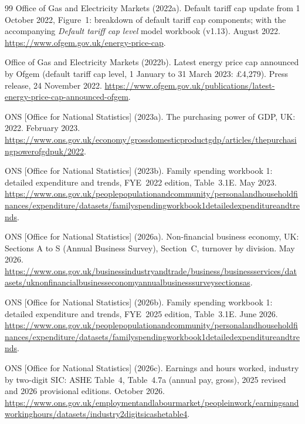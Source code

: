 \begin{thebibliography}{99}
Office of Gas and Electricity Markets (2022a).
\newblock Default tariff cap update from 1 October 2022, Figure~1: breakdown of default tariff cap components; with the accompanying \emph{Default tariff cap level} model workbook (v1.13).
 August 2022. \url{https://www.ofgem.gov.uk/energy-price-cap}.

Office of Gas and Electricity Markets (2022b).
\newblock Latest energy price cap announced by Ofgem (default tariff cap level, 1 January to 31 March 2023: \pounds 4{,}279).
\newblock Press release, 24 November 2022. \url{https://www.ofgem.gov.uk/publications/latest-energy-price-cap-announced-ofgem}.

ONS [Office for National Statistics] (2023a).
\newblock The purchasing power of GDP, UK: 2022.
 February 2023. \url{https://www.ons.gov.uk/economy/grossdomesticproductgdp/articles/thepurchasingpowerofgdpuk/2022}.

ONS [Office for National Statistics] (2023b).
\newblock Family spending workbook 1: detailed expenditure and trends, FYE~2022 edition, Table~3.1E.
 May 2023. \url{https://www.ons.gov.uk/peoplepopulationandcommunity/personalandhouseholdfinances/expenditure/datasets/familyspendingworkbook1detailedexpenditureandtrends}.

ONS [Office for National Statistics] (2026a).
\newblock Non-financial business economy, UK: Sections A to S (Annual Business Survey), Section~C, turnover by division.
 May 2026. \url{https://www.ons.gov.uk/businessindustryandtrade/business/businessservices/datasets/uknonfinancialbusinesseconomyannualbusinesssurveysectionsas}.

ONS [Office for National Statistics] (2026b).
\newblock Family spending workbook 1: detailed expenditure and trends, FYE~2025 edition, Table~3.1E.
 June 2026. \url{https://www.ons.gov.uk/peoplepopulationandcommunity/personalandhouseholdfinances/expenditure/datasets/familyspendingworkbook1detailedexpenditureandtrends}.

ONS [Office for National Statistics] (2026c).
\newblock Earnings and hours worked, industry by two-digit SIC: ASHE Table~4, Table~4.7a (annual pay, gross), 2025 revised and 2026 provisional editions.
 October 2026. \url{https://www.ons.gov.uk/employmentandlabourmarket/peopleinwork/earningsandworkinghours/datasets/industry2digitsicashetable4}.


\end{thebibliography}
